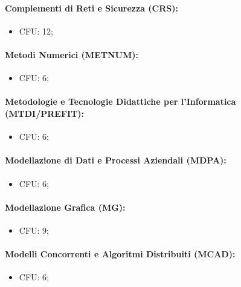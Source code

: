\paragraph{Complementi di Reti e Sicurezza (CRS):}

\begin{itemize}
  \item CFU: 12;
\end{itemize}

\paragraph{Metodi Numerici (METNUM):}

\begin{itemize}
  \item CFU: 6;
\end{itemize}

\paragraph{Metodologie e Tecnologie Didattiche per l'Informatica (MTDI/PREFIT):}

\begin{itemize}
  \item CFU: 6;
\end{itemize}

\paragraph{Modellazione di Dati e Processi Aziendali (MDPA):}

\begin{itemize}
  \item CFU: 6;
\end{itemize}

\paragraph{Modellazione Grafica (MG):}

\begin{itemize}
  \item CFU: 9;
\end{itemize}

\paragraph{Modelli Concorrenti e Algoritmi Distribuiti (MCAD):}

\begin{itemize}
  \item CFU: 6;
\end{itemize}

